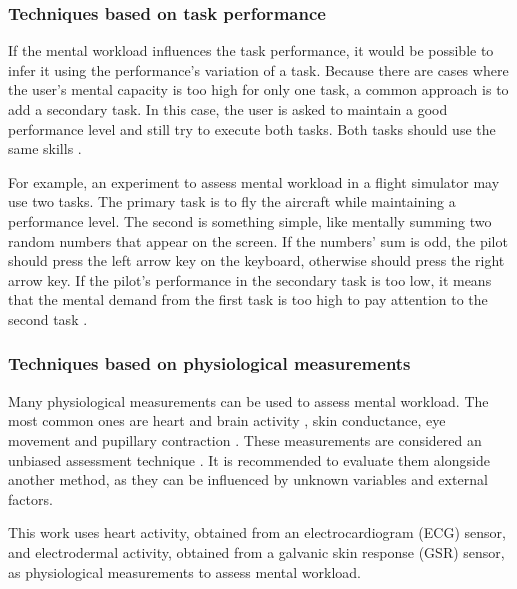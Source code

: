     \subsubsection*{Techniques based on task performance}
    
        If the mental workload influences the task performance, it would be possible to infer it using the performance's variation of a task. Because there are cases where the user's mental capacity is too high for only one task, a common approach is to add a secondary task. In this case, the user is asked to maintain a good performance level and still try to execute both tasks. Both tasks should use the same skills \cite{stanton2004handbook, sanders1998human}.
        
        For example, an experiment to assess mental workload in a flight simulator may use two tasks. The primary task is to fly the aircraft while maintaining a performance level. The second is something simple, like mentally summing two random numbers that appear on the screen. If the numbers' sum is odd, the pilot should press the left arrow key on the keyboard, otherwise should press the right arrow key. If the pilot's performance in the secondary task is too low, it means that the mental demand from the first task is too high to pay attention to the second task \cite{mohanavelu2020cognitive}.
        
    \subsubsection*{Techniques based on physiological measurements}
    
        Many physiological measurements can be used to assess mental workload. The most common ones are heart and brain activity \cite{chakladar2020eeg, orlandi2018measuring}, skin conductance, eye movement and pupillary contraction \cite{stanton2004handbook, rodriguez2015pupillometry}. These measurements are considered an unbiased assessment technique \cite{fallahi2016effects}. It is recommended to evaluate them alongside another method, as they can be influenced by unknown variables and external factors.

        This work uses heart activity, obtained from an electrocardiogram (ECG) sensor, and electrodermal activity, obtained from a galvanic skin response (GSR) sensor, as physiological measurements to assess mental workload.
                
